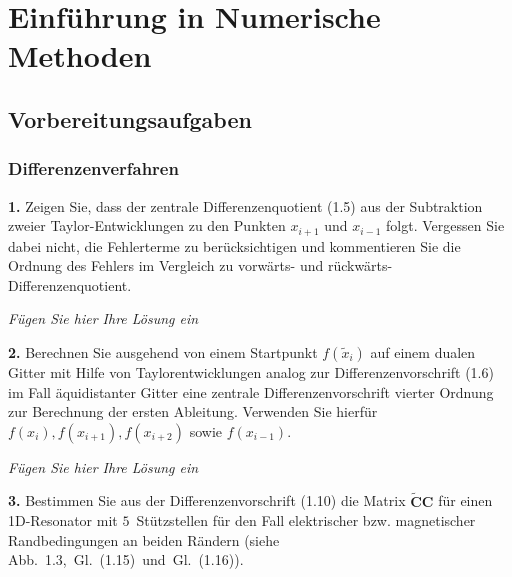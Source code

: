 \documentclass[Protokollheft.tex]{subfiles}
\begin{document}
\chapter{Einführung in Numerische Methoden}

\section{Vorbereitungsaufgaben}
    {\subsection{Differenzenverfahren}}

    \begin{framed}
	\noindent \textbf{1.} Zeigen Sie, dass der zentrale Differenzenquotient (1.5) aus der Subtraktion zweier Taylor-Entwicklungen zu den Punkten $x_{i+1}$ und $x_{i-1}$ folgt. Vergessen Sie dabei nicht, die Fehlerterme zu berücksichtigen und kommentieren Sie die Ordnung des Fehlers im Vergleich zu vorwärts- und rückwärts-Differenzenquotient.\label{exer:diffquot}
\end{framed}

\emph{Fügen Sie hier Ihre Lösung ein}

    \begin{framed}
	\noindent \textbf{2.} Berechnen Sie ausgehend von einem Startpunkt \(f(\tilde{x}_i)\) auf einem dualen Gitter mit Hilfe von Taylorentwicklungen analog zur Differenzenvorschrift (1.6) im Fall äquidistanter Gitter eine zentrale Differenzenvorschrift vierter Ordnung zur Berechnung der ersten Ableitung. Verwenden Sie hierfür \(f(x_i), f(x_{i+1}), f(x_{i+2})\) sowie \(f(x_{i-1})\).\label{exer:diffquotOrd4}
\end{framed}

\emph{Fügen Sie hier Ihre Lösung ein}

    \begin{framed}
	\noindent \textbf{3.} Bestimmen Sie aus der Differenzenvorschrift (1.10) die Matrix $\tilde{\textbf{C}}\textbf{C}$ für einen 1D-Resonator mit $5$~Stützstellen für den Fall elektrischer bzw. magnetischer Randbedingungen an beiden Rändern (siehe Abb.~1.3,~Gl.~(1.15)~und~Gl.~(1.16)).\label{exer:matrixCC}
\end{framed}
\end{document}
